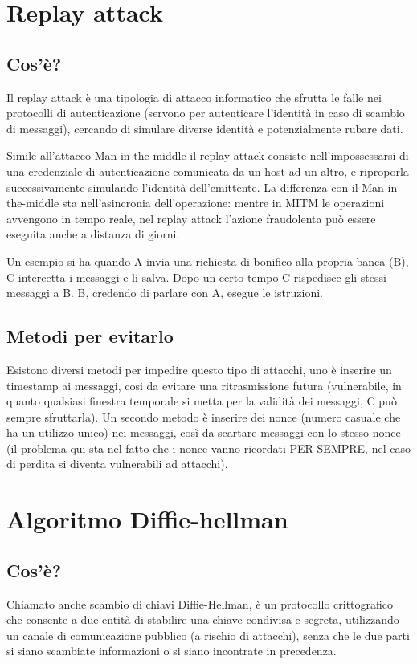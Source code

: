 \section{Replay attack}
\subsection{Cos'è?}
Il replay attack è una tipologia di attacco informatico che sfrutta le falle nei protocolli di autenticazione (servono per autenticare l'identità in caso di scambio di messaggi), cercando di simulare diverse identità e potenzialmente rubare dati.

Simile all'attacco Man-in-the-middle il replay attack consiste nell'impossessarsi di una credenziale di autenticazione comunicata da un host ad un altro, e riproporla successivamente simulando l'identità dell'emittente. La differenza con il Man-in-the-middle sta nell'asincronia dell'operazione: mentre in MITM le operazioni avvengono in tempo reale, nel replay attack l'azione fraudolenta può essere eseguita anche a distanza di giorni.

Un esempio si ha quando A invia una richiesta di bonifico alla propria banca (B), C intercetta i messaggi e li salva. Dopo un certo tempo C rispedisce gli stessi messaggi a B. B, credendo di parlare con A, esegue le istruzioni. 
\subsection{Metodi per evitarlo}
Esistono diversi metodi per impedire questo tipo di attacchi, uno è inserire un timestamp ai messaggi, cosi da evitare una ritrasmissione futura (vulnerabile, in quanto qualsiasi finestra temporale si metta per la validità dei messaggi, C può sempre sfruttarla).
Un secondo metodo è inserire dei nonce (numero casuale che ha un utilizzo unico) nei messaggi, così da scartare messaggi con lo stesso nonce (il problema qui sta nel fatto che i nonce vanno ricordati PER SEMPRE, nel caso di perdita si diventa vulnerabili ad attacchi).

\section{Algoritmo Diffie-hellman}
\subsection{Cos'è?}
Chiamato anche scambio di chiavi Diffie-Hellman, è un protocollo crittografico che consente a due entità di stabilire una chiave condivisa e segreta, utilizzando un canale di comunicazione pubblico (a rischio di attacchi), senza che le due parti si siano scambiate informazioni o si siano incontrate in precedenza.

